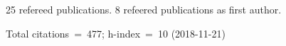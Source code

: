 25 refereed publications. 8 refeered publications as first author.

Total citations~=~477; h-index~=~10 (2018-11-21)